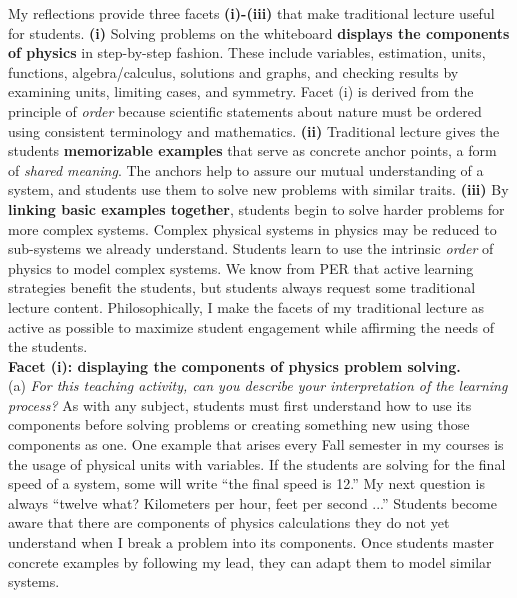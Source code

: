 \documentclass[../../../main.tex]{subfiles}
\begin{document}
My reflections provide three facets \textbf{(i)-(iii)} that make traditional lecture useful for students. \textbf{(i)} Solving problems on the whiteboard \textbf{displays the components of physics} in step-by-step fashion.  These include variables, estimation, units, functions, algebra/calculus, solutions and graphs, and checking results by examining units, limiting cases, and symmetry.  Facet (i) is derived from the principle of \textit{order} because scientific statements about nature must be ordered using consistent terminology and mathematics. \textbf{(ii)} Traditional lecture gives the students \textbf{memorizable examples} that serve as concrete anchor points, a form of \textit{shared meaning}.  The anchors help to assure our mutual understanding of a system, and students use them to solve new problems with similar traits.  \textbf{(iii)} By \textbf{linking basic examples together}, students begin to solve harder problems for more complex systems.  Complex physical systems in physics may be reduced to sub-systems we already understand.  Students learn to use the intrinsic \textit{order} of physics to model complex systems.  We know from PER that active learning strategies benefit the students, but students always request some traditional lecture content.  Philosophically, I make the facets of my traditional lecture as active as possible to maximize student engagement while affirming the needs of the students.
\\
\vspace{0.25cm}
\textbf{Facet (i): displaying the components of physics problem solving.}
\\
\vspace{0.25cm}
(a) \textit{For this teaching activity, can you describe your interpretation of the learning process?}  As with any subject, students must first understand how to use its components before solving problems or creating something new using those components as one.  One example that arises every Fall semester in my courses is the usage of physical units with variables.  If the students are solving for the final speed of a system, some will write ``the final speed is 12.''  My next question is always ``twelve what? Kilometers per hour, feet per second ...'' Students become aware that there are components of physics calculations they do not yet understand when I break a problem into its components.  Once students master concrete examples by following my lead, they can adapt them to model similar systems.
\\
\vspace{0.25cm}
\end{document}
